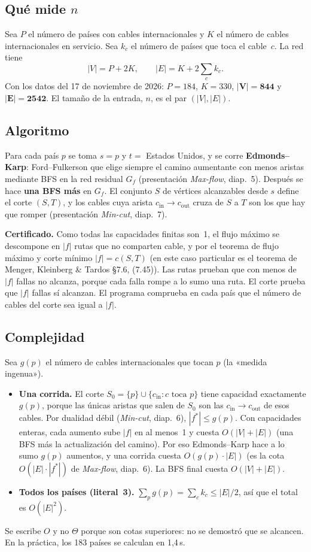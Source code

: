 \documentclass[11pt,a4paper]{article}
\newcommand{\cin}[1]{#1_{\mathrm{in}}}
\newcommand{\cout}[1]{#1_{\mathrm{out}}}
\begin{document}
\subsection*{Qué mide $n$}
Sea $P$ el número de países con cables internacionales y $K$ el número de cables internacionales en servicio. Sea $k_c$ el número de países que toca el cable~$c$. La red tiene
\[
|V| = P + 2K, \qquad |E| = K + 2\sum_c k_c .
\]
Con los datos del 17 de noviembre de 2026: $P=184$, $K=330$, $\mathbf{|V|=844}$ y $\mathbf{|E|=2542}$. El tamaño de la entrada, $n$, es el par $(|V|,|E|)$.

\subsection*{Algoritmo}
Para cada país $p$ se toma $s=p$ y $t=$ Estados Unidos, y se corre \textbf{Edmonds--Karp}: Ford--Fulkerson que elige siempre el camino aumentante con menos aristas mediante BFS en la red residual $G_f$ (presentación \emph{Max-flow}, diap.~5). Después se hace \textbf{una BFS más} en $G_f$. El conjunto $S$ de vértices alcanzables desde $s$ define el corte $(S,T)$, y los cables cuya arista $\cin{c}\to\cout{c}$ cruza de $S$ a $T$ son los que hay que romper (presentación \emph{Min-cut}, diap.~7).

\textbf{Certificado.} Como todas las capacidades finitas son~1, el flujo máximo se descompone en $|f|$ rutas que no comparten cable, y por el teorema de flujo máximo y corte mínimo $|f| = c(S,T)$ (en este caso particular es el teorema de Menger, Kleinberg \& Tardos §7.6, (7.45)). Las rutas prueban que con menos de $|f|$ fallas no alcanza, porque cada falla rompe a lo sumo una ruta. El corte prueba que $|f|$ fallas sí alcanzan. El programa comprueba en cada país que el número de cables del corte sea igual a $|f|$.

\subsection*{Complejidad}
Sea $g(p)$ el número de cables internacionales que tocan $p$ (la «medida ingenua»).
\begin{itemize}
  \item \textbf{Una corrida.} El corte $S_0=\{p\}\cup\{\cin{c} : c \text{ toca } p\}$ tiene capacidad exactamente $g(p)$, porque las únicas aristas que salen de $S_0$ son las $\cin{c}\to\cout{c}$ de esos cables. Por dualidad débil (\emph{Min-cut}, diap.~6), $|f^*|\le g(p)$. Con capacidades enteras, cada aumento sube $|f|$ en al menos~1 y cuesta $O(|V|+|E|)$ (una BFS más la actualización del camino). Por eso Edmonds--Karp hace a lo sumo $g(p)$ aumentos, y una corrida cuesta $O(g(p)\cdot|E|)$ (es la cota $O(|E|\cdot|f^*|)$ de \emph{Max-flow}, diap.~6). La BFS final cuesta $O(|V|+|E|)$.
  \item \textbf{Todos los países (literal~3).} $\sum_p g(p) = \sum_c k_c \le |E|/2$, así que el total es $O(|E|^2)$.
\end{itemize}
Se escribe $O$ y no $\Theta$ porque son cotas superiores: no se demostró que se alcancen. En la práctica, los 183 países se calculan en 1{,}4\,s.
\end{document}
